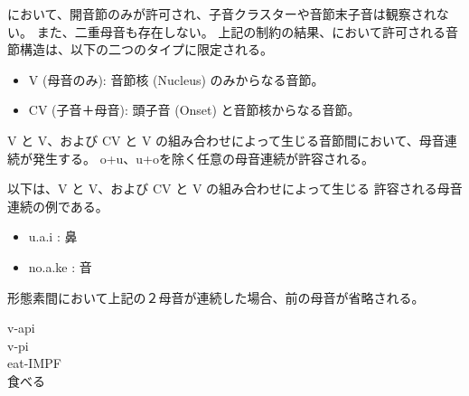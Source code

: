 \langname において、開音節のみが許可され、子音クラスターや音節末子音は観察されない。
また、二重母音も存在しない。
上記の制約の結果、\langname において許可される音節構造は、以下の二つのタイプに限定される。

\begin{itemize}
    \item {V (母音のみ)}: 音節核 (Nucleus) のみからなる音節。
    \item {CV (子音＋母音)}: 頭子音 (Onset) と音節核からなる音節。
\end{itemize}

{V} と {V}、および {CV} と {V} の組み合わせによって生じる音節間において、母音連続が発生する。
o+u、u+oを除く任意の母音連続が許容される。

以下は、{V} と {V}、および {CV} と {V} の組み合わせによって生じる
許容される母音連続の例である。

\begin{itemize}
    \item u.a.i : 鼻 %
    \item no.a.ke : 音
\end{itemize}

形態素間において上記の２母音が連続した場合、前の母音が省略される。
\begin{exe}
    \ex \glll v-api \\
    v-pi \\
    eat-IMPF \\
   \glt 食べる
\end{exe}
